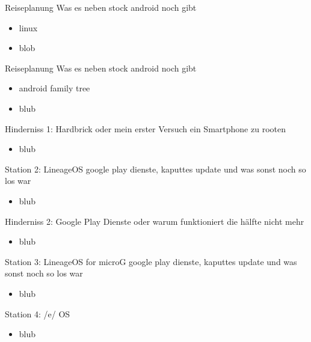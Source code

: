 \documentclass[14pt,compress,usenames,dvipsnames,aspectratio=169]{beamer}
\begin{document}
\begin{frame}{Reiseplanung}
    Was es neben stock android noch gibt
    \begin{itemize}
        \item linux
        \item blob
    \end{itemize}
\end{frame}

\begin{frame}{Reiseplanung}
    Was es neben stock android noch gibt
    \begin{itemize}
        \item android family tree 
        \item blub
    \end{itemize}
\end{frame}

\begin{frame}{Hinderniss 1: Hardbrick}
    oder mein erster Versuch ein Smartphone zu rooten
    \begin{itemize}
        \item blub
    \end{itemize}
\end{frame}

\begin{frame}{Station 2: LineageOS}
    google play dienste, kaputtes update und was sonst noch so los war
    \begin{itemize}
        \item blub
    \end{itemize}
\end{frame}

\begin{frame}{Hinderniss 2: Google Play Dienste}
    oder warum funktioniert die hälfte nicht mehr
    \begin{itemize}
        \item blub
    \end{itemize}
\end{frame}

\begin{frame}{Station 3: LineageOS for microG}
    google play dienste, kaputtes update und was sonst noch so los war
    \begin{itemize}
        \item blub
    \end{itemize}
\end{frame}

\begin{frame}{Station 4: /e/ OS}
    \begin{itemize}
        \item blub
    \end{itemize}
\end{frame}
\end{document}
